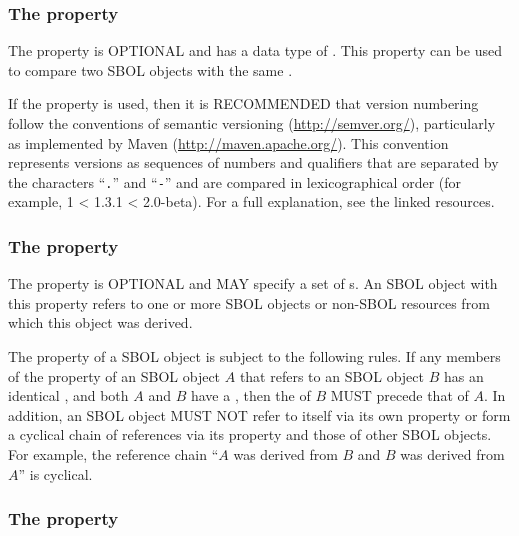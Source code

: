 
\subsubsection*{The  property}
\label{sec:version}

The  property is OPTIONAL and has a data type of . This property can be used to compare two SBOL objects with the same .

If the  property is used, then it is RECOMMENDED that version numbering follow the conventions of semantic versioning (\url{http://semver.org/}), particularly as implemented by Maven (\url{http://maven.apache.org/}).
This convention represents versions as sequences of numbers and qualifiers that are separated by the characters ``{\tt .}'' and ``{\tt -}'' and are compared in lexicographical order (for example, 1 < 1.3.1 < 2.0-beta).
For a full explanation, see the linked resources.

\subsubsection*{The  property}
\label{sec:wasDerivedFroms}


The  property is OPTIONAL and MAY specify a set of s. An SBOL object with this property refers to one or more SBOL objects or non-SBOL resources from which this object was derived.

The  property of a  SBOL object is subject to the following rules.
If any members of the  property of an SBOL object $A$ that refers to an SBOL object $B$ has an identical , and both $A$ and $B$ have a , then the  of $B$ MUST precede that of $A$.
In addition, an SBOL object MUST NOT refer to itself via its own  property or form a cyclical chain of references via its  property and those of other SBOL objects. For example, the reference chain ``$A$ was derived from $B$ and $B$ was derived from $A$'' is cyclical.


\subsubsection*{The  property}
\label{sec:name}

